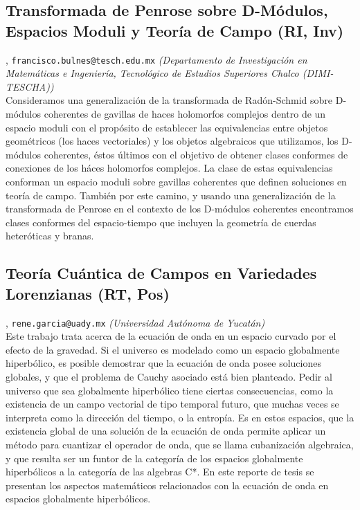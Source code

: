 \subsection{\sffamily Transformada de Penrose sobre D-M\'odulos, Espacios Moduli y Teor\'ia de Campo {\footnotesize (RI, Inv)}} \label{reg-308} 
, {\tt francisco.bulnes@tesch.edu.mx}  {\slshape (Departamento de Investigaci\'on en Matem\'aticas e Ingenier\'ia, Tecnol\'ogico de Estudios Superiores Chalco (DIMI-TESCHA))}\\
          \noindent  Consideramos una generalizaci\'on de la transformada de Rad\'on-Schmid sobre D-m\'odulos coherentes de gavillas de haces holomorfos complejos dentro de un espacio moduli con el prop\'osito de establecer las equivalencias entre objetos geom\'etricos (los haces vectoriales) y los objetos algebraicos que utilizamos, los D-m\'odulos coherentes, \'estos \'ultimos con el objetivo de obtener clases conformes de conexiones de los h\'aces holomorfos complejos. La clase de estas equivalencias conforman un espacio moduli sobre gavillas coherentes que definen soluciones en teor\'ia de campo. Tambi\'en por este camino, y usando una generalizaci\'on de la transformada de Penrose en el contexto de los D-m\'odulos coherentes encontramos clases conformes del espacio-tiempo que incluyen la geometr\'ia de cuerdas heter\'oticas y branas.
\subsection{\sffamily Teor\'ia Cu\'antica de Campos en Variedades Lorenzianas {\footnotesize (RT, Pos)}} \label{reg-403} 
, {\tt rene.garcia@uady.mx}  {\slshape (Universidad Aut\'onoma de Yucat\'an)}\\
          \noindent Este trabajo trata acerca de la ecuaci\'on de onda en un espacio curvado por el efecto de la gravedad. Si el universo es modelado como un espacio globalmente hiperb\'olico, es posible demostrar que la ecuaci\'on de onda posee soluciones globales, y que el problema de Cauchy asociado est\'a bien planteado. Pedir al universo que sea globalmente hiperb\'olico tiene ciertas consecuencias, como la existencia de un campo vectorial de tipo temporal futuro, que muchas veces se interpreta como la direcci\'on del tiempo, o la entrop\'ia. Es en estos espacios, que la existencia global de una soluci\'on de la ecuaci\'on de onda permite aplicar un m\'etodo para cuantizar el operador de onda, que se llama cubanizaci\'on algebraica, y que resulta ser un funtor de la categor\'ia de los espacios globalmente hiperb\'olicos a la categor\'ia de las algebras C*. En este reporte de tesis se presentan los aspectos matem\'aticos relacionados con la ecuaci\'on de onda en espacios globalmente hiperb\'olicos.

